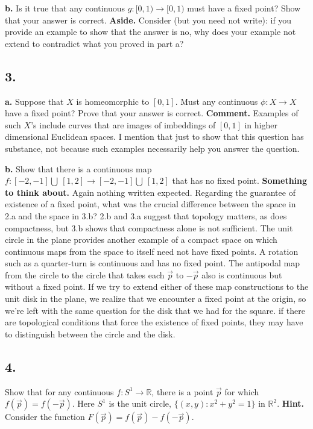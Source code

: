 \documentclass{amsart}
\theoremstyle{plain}
\theoremstyle{definition}
\theoremstyle{remark}
\begin{document}
\vspace{.1in}
{\bfseries b.} Is it true that any continuous $g : [0,1) \rightarrow [0,1)$ must have a fixed point? Show that your answer is correct. {\bfseries Aside.} Consider (but you need not write): if you provide an example to show that the answer is no, why does your example not extend to contradict what you proved in part a?

\vspace{.15in}
\noindent
\subsection*{3.}

\vspace{.1in}
{\bfseries a.} Suppose that $X$ is homeomorphic to $[0,1]$. Must any continuous $\phi : X \rightarrow X$ have a fixed point? Prove that your answer is correct. {\bfseries Comment.} Examples of such $X$'s include curves that are images of imbeddings of $[0,1]$ in higher dimensional Euclidean spaces. I mention that just to show that this question has substance, not because such examples necessarily help you answer the question. 

\vspace{.1in}
{\bfseries b.} Show that there is a continuous map $f : [-2, -1] \bigcup  \ [1,2] \rightarrow [-2, -1] \bigcup \ [1,2]$ that has no fixed point. {\bfseries Something to think about.} Again nothing written expected. Regarding the guarantee of existence of a fixed point, what was the crucial difference between the space in 2.a and the space in 3.b? 2.b and 3.a suggest that topology matters, as does compactness, but 3.b shows that compactness alone is not sufficient. The unit circle in the plane provides another example of a compact space on which continuous maps from the space to itself need not have fixed points. A rotation such as a quarter-turn is continuous and has no fixed point. The antipodal map from the circle to the circle that takes each $\vec{p}$ to $-\vec{p}$ also is continuous but without a fixed point. If we try to extend either of these map constructions to the unit disk in the plane, we realize that we encounter a fixed point at the origin, so we're left with the same question for the disk that we had for the square.  if there are topological conditions that force the existence of fixed points, they may have to distinguish between the circle and the disk. 


\vspace{.15in}
\noindent
\subsection*{4.} Show that for any continuous $f : S^1 \rightarrow \mathbb R$, there is a point $\vec{p}$ for which $f(\vec{p}) = f(-\vec{p})$. Here $S^1$ is the unit circle, $\{ (x,y) : x^2 + y^2 = 1\}$ in $\mathbb R ^2$. {\bfseries Hint.} Consider the function $F(\vec{p}) = f(\vec{p}) - f(-\vec{p})$.
\end{document}
